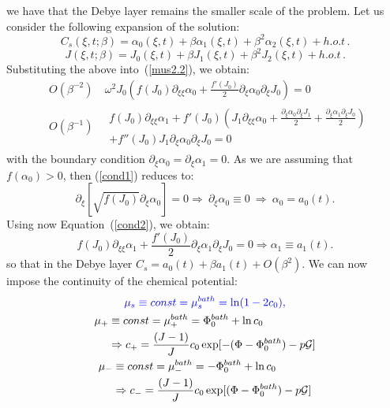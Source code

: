 \documentclass[12pt]{extarticle}
\begin{document}
we have that the Debye layer remains the smaller scale of the problem. Let us consider the following expansion of the solution:
\begin{equation}
C_s(\xi,t;\beta) = \alpha_0(\xi,t) + \beta \alpha_1(\xi,t) + \beta^2 \alpha_2(\xi,t)+ h.o.t\,. 
\end{equation}
\begin{equation}
J(\xi,t;\beta) = J_0(\xi,t) + \beta J_1(\xi,t) + \beta^2 J_2(\xi,t)+ h.o.t\,. 
\end{equation}
Substituting the above into~(\ref{mus2.2}), we obtain:
\begin{eqnarray}
&O(\beta^{-2})& \ \omega^2 J_0\left(f(J_0)\partial_{\xi\xi}\alpha_0+ \frac{f'(J_0)}{2}\partial_\xi \alpha_0\partial_\xi J_0\right)=0\label{cond1}\\
&O(\beta^{-1})& \ \begin{aligned}
f(J_0)\partial_{\xi\xi}\alpha_1+ f'(J_0)\left(J_1\partial_{\xi\xi}\alpha_0+\frac{\partial_\xi \alpha_0\partial_\xi J_1}{2}+\frac{\partial_\xi \alpha_1\partial_\xi J_0}{2}\right)
\\+f''(J_0)J_1\partial_\xi \alpha_0\partial_\xi J_0=0 \label{cond2}
\end{aligned}
\end{eqnarray} 
with the boundary condition $\partial_\xi \alpha_0=\partial_\xi \alpha_1=0$. 
As we are assuming that $f(\alpha_0)>0$, then (\ref{cond1}) reduces to:
\begin{equation}
\partial_{\xi}\left[ \sqrt{f(J_0)}\partial_\xi \alpha_0\right]=0 \Rightarrow \ \partial_\xi \alpha_0\equiv 0\  \Rightarrow \ \alpha_0= a_0(t).
\end{equation} 
Using now Equation~(\ref{cond2}), we obtain:
\begin{equation}
f(J_0)\partial_{\xi\xi}\alpha_1 +\frac{f'(J_0)}{2}\partial_{\xi}\alpha_1\partial_{\xi}J_0= 0  \Rightarrow \alpha_1 \equiv a_1(t).
\end{equation} 
so that in the Debye layer $C_s= a_0(t) + \beta a_1(t) + O(\beta^2)$.
\color{black}
We can now impose the continuity of the chemical potential:
\begin{gather}
\color{blue}\mu_s \equiv const = \mu^{bath}_s= \ln(1-2c_0),\\
\begin{aligned}
\mu_+ &\equiv const = \mu^{bath}_+=  \Phi_0^{bath} + \ln c_0 \\&\Rightarrow c_+=\frac{(J-1)}{J}c_0\exp[-(\Phi-\Phi_0^{bath})-p\mathcal{G}]
\end{aligned}\\
\begin{aligned}
\mu_- &\equiv const = \mu^{bath}_-= - \Phi_0^{bath} + \ln c_0\\ &\Rightarrow c_-=\frac{(J-1)}{J}c_0\exp[(\Phi-\Phi_0^{bath})-p\mathcal{G}]
\end{aligned}
\end{gather}
\end{document}
